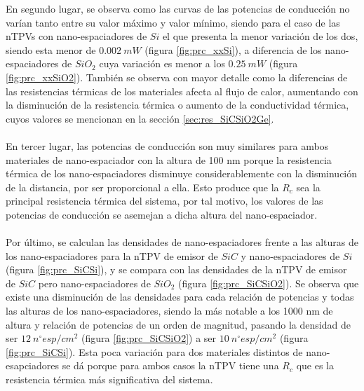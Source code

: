 En segundo lugar, se observa como las curvas de las potencias de conducción no varían tanto entre su valor máximo y valor mínimo, siendo para el caso de las nTPVs con nano-espaciadores de $Si$ el que presenta la menor variación de los dos, siendo esta menor de $0.002 \ mW$ (figura \ref{fig:prc_xxSi}), a diferencia de los nano-espaciadores de $SiO_2$ cuya variación es menor a los $0.25 \ mW$ (figura \ref{fig:prc_xxSiO2}). También se observa con mayor detalle como la diferencias de las resistencias térmicas de los materiales afecta al flujo de calor, aumentando con la disminución de la resistencia térmica o aumento de la conductividad térmica, cuyos valores se mencionan en la sección \ref{sec:res_SiCSiO2Ge}.\\\\
En tercer lugar, las potencias de conducción son muy similares para ambos materiales de nano-espaciador con la altura de 100 nm porque la resistencia térmica de los nano-espaciadores disminuye considerablemente con la disminución de la distancia, por ser proporcional a ella. Esto produce que la $R_c$ sea la principal resistencia térmica del sistema, por tal motivo, los valores de las potencias de conducción se asemejan a dicha altura del nano-espaciador.\\\\
Por último, se calculan las densidades de nano-espaciadores frente a las alturas de los nano-espaciadores para la nTPV de emisor de $SiC$ y nano-espaciadores de $Si$ (figura \ref{fig:prc_SiCSi}), y se compara con las densidades de la nTPV de emisor de $SiC$ pero nano-espaciadores de $SiO_2$ (figura \ref{fig:prc_SiCSiO2}). Se observa que existe una disminución de las densidades para cada relación de potencias y todas las alturas de los nano-espaciadores, siendo la más notable a los 1000 nm de altura y relación de potencias de un orden de magnitud, pasando la densidad de ser $12 \ n^{\circ}esp/cm^2$ (figura \ref{fig:prc_SiCSiO2}) a ser $10 \ n^{\circ}esp/cm^2$ (figura \ref{fig:prc_SiCSi}). Esta poca variación para dos materiales distintos de nano-esapciadores se dá porque para ambos casos la nTPV tiene una $R_c$ que es la resistencia térmica más significativa del sistema.
